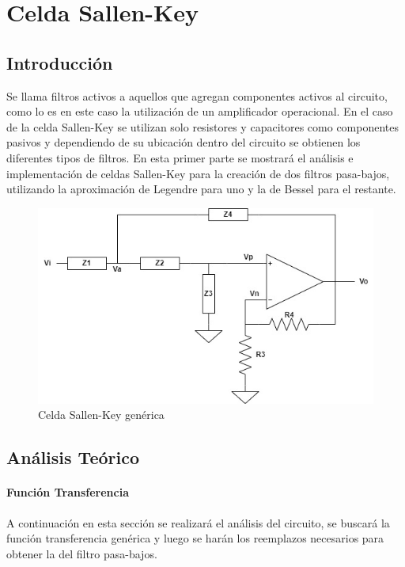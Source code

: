 \chapter{Celda Sallen-Key}
 
\section{Introducción}
	Se llama filtros activos a aquellos que agregan componentes activos al circuito, como lo es en este caso la utilización de un amplificador operacional. En el caso de la celda Sallen-Key se utilizan solo resistores y capacitores como componentes pasivos y dependiendo de su ubicación dentro del circuito se obtienen los diferentes tipos de filtros.
	En esta primer parte se mostrará el análisis e implementación de celdas Sallen-Key para la creación de dos filtros pasa-bajos, utilizando la aproximación de Legendre para uno y la de Bessel para el restante.
	
\begin{figure}[H]
	\centering
	\includegraphics[scale=0.5]{../Ex1/Informe/sallenkeygenerico.jpg}
	\caption{Celda Sallen-Key genérica}
	\label{fig:sallenkeygenerica}
\end{figure}
	
\section{Análisis Teórico}

\subsubsection{Función Transferencia}
	A continuación en esta sección se realizará el análisis del circuito, se buscará la función transferencia genérica y luego se harán los reemplazos necesarios para obtener la del filtro pasa-bajos.
	
